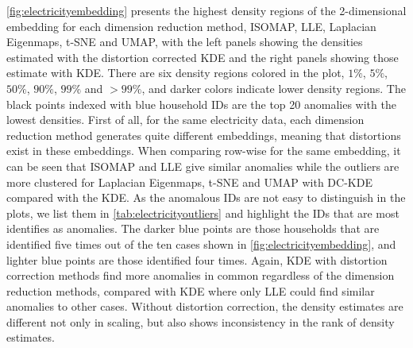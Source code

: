 \documentclass[11pt,a4paper,]{article}
\begin{document}
\autoref{fig:electricityembedding} presents the highest density regions of the 2-dimensional embedding for each dimension reduction method, ISOMAP, LLE, Laplacian Eigenmaps, t-SNE and UMAP, with the left panels showing the densities estimated with the distortion corrected KDE and the right panels showing those estimate with KDE. There are six density regions colored in the plot, \(1\%\), \(5\%\), \(50\%\), \(90\%\), \(99\%\) and \(>99\%\), and darker colors indicate lower density regions. The black points indexed with blue household IDs are the top 20 anomalies with the lowest densities. First of all, for the same electricity data, each dimension reduction method generates quite different embeddings, meaning that distortions exist in these embeddings. When comparing row-wise for the same embedding, it can be seen that ISOMAP and LLE give similar anomalies while the outliers are more clustered for Laplacian Eigenmaps, t-SNE and UMAP with DC-KDE compared with the KDE. As the anomalous IDs are not easy to distinguish in the plots, we list them in \autoref{tab:electricityoutliers} and highlight the IDs that are most identifies as anomalies. The darker blue points are those households that are identified five times out of the ten cases shown in \autoref{fig:electricityembedding}, and lighter blue points are those identified four times. Again, KDE with distortion correction methods find more anomalies in common regardless of the dimension reduction methods, compared with KDE where only LLE could find similar anomalies to other cases. Without distortion correction, the density estimates are different not only in scaling, but also shows inconsistency in the rank of density estimates.
\end{document}
